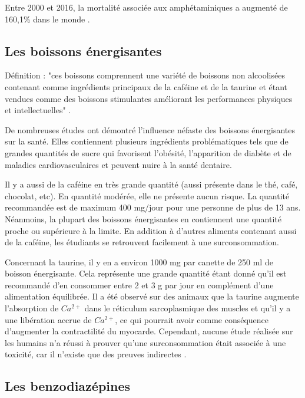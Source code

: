 Entre 2000 et 2016, la mortalité associée aux amphétaminiques a augmenté de 160,1\% dans le monde \parencite{mattiuzzi_worldwide_2019}. 

\subsection{Les boissons énergisantes}

Définition : "ces boissons comprennent une variété de boissons non alcoolisées contenant comme ingrédients principaux de la caféine et de la taurine et étant vendues comme des boissons stimulantes améliorant les performances physiques et intellectuelles" \parencite{barrense-dias_les_nodate}.

De nombreuses études ont démontré l'influence néfaste des boissons énergisantes sur la santé. Elles contiennent plusieurs ingrédients problématiques tels que de grandes quantités de sucre qui favorisent l'obésité, l'apparition de diabète et de maladies cardiovasculaires et peuvent nuire à la santé dentaire.

Il y a aussi de la caféine en très grande quantité (aussi présente dans le thé, café, chocolat, etc). En quantité modérée, elle ne présente aucun risque. La quantité recommandée est de maximum 400 mg/jour pour une personne de plus de 13 ans. Néanmoins, la plupart des boissons énergisantes en contiennent une quantité proche ou supérieure à la limite. En addition à d'autres aliments contenant aussi de la caféine, les étudiants se retrouvent facilement à une surconsommation. 

Concernant la taurine, il y en a environ 1000 mg par canette de 250 ml de boisson énergisante. Cela représente une grande quantité étant donné qu'il est recommandé d'en consommer entre 2 et 3 g par jour en complément d'une alimentation équilibrée. Il a été observé sur des animaux que la taurine augmente l'absorption de $Ca^{2+}$ dans le réticulum sarcoplasmique des muscles et qu'il y a une libération accrue de  $Ca^{2+}$, ce qui pourrait avoir comme conséquence d'augmenter la contractilité du myocarde. Cependant, aucune étude réalisée sur les humains n'a réussi à prouver qu'une surconsommation était associée à une toxicité, car il n'existe que des preuves indirectes \parencite{bigard_dangers_2010, dutka_acute_2014, higgins_energy_2018, picard-masson_consumption_2016}.

\subsection{Les benzodiazépines}


